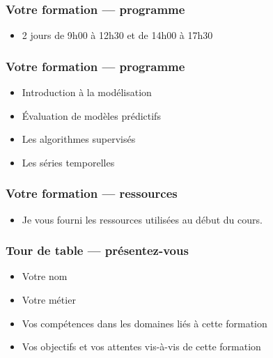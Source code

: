 \documentclass{formation}
\begin{document}
\begin{frame}
  \frametitle{Votre formation — programme}
  \begin{itemize}
  \item 2 jours de 9h00 à 12h30 et de 14h00 à 17h30
  \end{itemize}
\end{frame}

\begin{frame}
  \frametitle{Votre formation — programme}
  \begin{itemize}
  \item Introduction à la modélisation
  \item Évaluation de modèles prédictifs
  \item Les algorithmes supervisés
  \item Les séries temporelles
  \end{itemize}
\end{frame}

\begin{frame}
  \frametitle{Votre formation — ressources}
  \begin{itemize}
  \item Je vous fourni les ressources utilisées au début du cours.
  \end{itemize}
\end{frame}

\begin{frame}
  \frametitle{Tour de table — présentez-vous}
  \begin{itemize}
  \item Votre nom
  \item Votre métier
  \item Vos compétences dans les domaines liés à cette formation
  \item Vos objectifs et vos attentes vis-à-vis de cette formation
  \end{itemize}
\end{frame}
\end{document}
